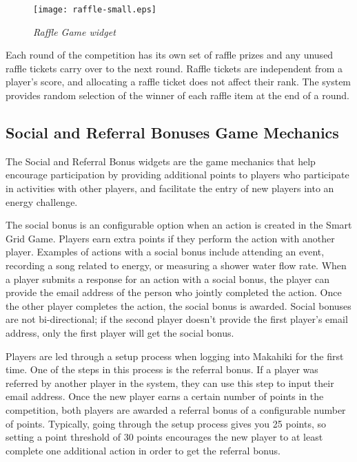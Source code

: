 \begin{figure}[th]
  \center
  \texttt{[image: raffle-small.eps]}
  \caption{\em Raffle Game widget}
  \label{fig:RaffleGame}
\end{figure}

Each round of the competition has its own set of raffle prizes and any unused raffle tickets carry over to the next round. Raffle tickets are independent from a player's score, and allocating a raffle ticket does not affect their rank. The system provides random selection of the winner of each raffle item at the end of a round.

\subsection{Social and Referral Bonuses Game Mechanics}

The Social and Referral Bonus widgets are the game mechanics that help encourage participation by providing additional points to players who participate in activities with other players, and facilitate the entry of new players into an energy challenge.

The social bonus is an configurable option when an action is created in the Smart Grid Game. Players earn extra points if they perform the action with another player. Examples of actions with a social bonus include attending an event, recording a song related to energy, or measuring a shower water flow rate. When a player submits a response for an action with a social bonus, the player can provide the email address of the person who jointly completed the action. Once the other player completes the action, the social bonus is awarded. Social bonuses are not bi-directional; if the second player doesn't provide the first player's email address, only the first player will get the social bonus.

Players are led through a setup process when logging into Makahiki for the first time. One of the steps in this process is the referral bonus. If a player was referred by another player in the system, they can use this step to input their email address. Once the new player earns a certain number of points in the competition, both players are awarded a referral bonus of a configurable number of points. Typically, going through the setup process gives you 25 points, so setting a point threshold of 30 points encourages the new player to at least complete one additional action in order to get the referral bonus.

